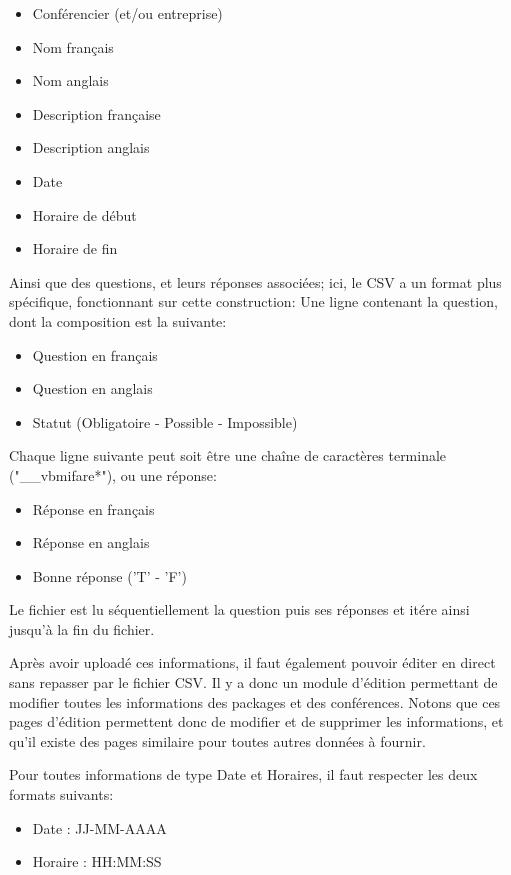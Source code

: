     \begin{itemize}
    \item Conférencier (et/ou entreprise)
    \item Nom français
    \item Nom anglais
    \item Description française
    \item Description anglais
    \item Date
    \item Horaire de début
    \item Horaire de fin
    \end{itemize}

Ainsi que des questions, et leurs réponses associées; ici, le CSV a un format plus spécifique, fonctionnant sur cette construction:
Une ligne contenant la question, dont la composition est la suivante:

    \begin{itemize}
    \item Question en français
    \item Question en anglais
    \item Statut (Obligatoire - Possible - Impossible)
    \end{itemize}

Chaque ligne suivante peut soit être une chaîne de caractères terminale ("\_\_vbmifare*"), ou une réponse:

    \begin{itemize}
    \item Réponse en français
    \item Réponse en anglais
    \item Bonne réponse ('T' - 'F')
    \end{itemize}

Le fichier est lu séquentiellement la question puis ses réponses et itére ainsi jusqu'à la fin du fichier.

Après avoir uploadé ces informations, il faut également pouvoir éditer en direct sans repasser par le fichier CSV.
Il y a donc un module d'édition permettant de modifier toutes les informations des packages et des conférences.
Notons que ces pages d'édition permettent donc de modifier et de supprimer les informations, et qu'il existe des pages
similaire pour toutes autres données à fournir.

Pour toutes informations de type Date et Horaires, il faut respecter les deux formats suivants:

    \begin{itemize}
    \item Date : JJ-MM-AAAA
    \item Horaire : HH:MM:SS
    \end{itemize}

